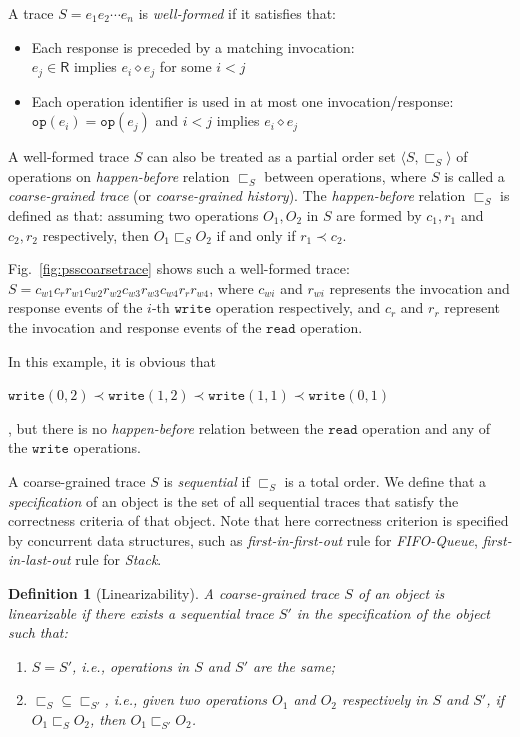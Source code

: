 \documentclass[runningheads]{llncs}
\newcommand{\eresp}{\mathsf{R}}
\newcommand{\pair}[1]{{\langle{#1}\rangle}}
\newtheorem{myDef}{Definition}
\newcommand{\wri}{\mathtt{write}}
\newcommand{\rea}{\mathtt{read}}
\newcommand{\hb}{\textit{happen-before }}
\begin{document}
 A trace $S = e_1e_2\cdots e_n$ is \textit{well-formed} if it satisfies that:
\begin{itemize}
  \item Each response is preceded by a matching invocation:\\
  $e_j\in \eresp$ implies $e_i \diamond e_j$ for some $i<j$
  \item Each operation identifier is used in at most one invocation/response:\\
  $\mathtt{op}(e_i)=\mathtt{op}(e_j)$ and $i<j$ implies $e_i \diamond e_j$
\end{itemize}
 A well-formed trace $S$ can also be treated as a partial order set $\pair{S,\sqsubset_S}$ of operations on \textit{happen-before}  relation $\sqsubset_S$ between operations, where $S$ is called a \textit{coarse-grained trace} (or \textit{coarse-grained history}). The \textit{happen-before} relation $\sqsubset_S$ is defined as that: assuming two operations $O_1,O_2$ in $S$ are formed by $c_1,r_1$ and $c_2,r_2$ respectively, then $O_1\sqsubset_S O_2$ if and only if $r_1\prec c_2$.

\begin{example}
Fig.~\ref{fig:psscoarsetrace} shows such a well-formed trace:
$S = c_{w1}c_rr_{w1}c_{w2}r_{w2}c_{w3}r_{w3}c_{w4}r_{r}r_{w4}$, where $c_{wi}$ and $r_{wi}$
represents the invocation and response events of the $i$-th $\mathtt{write}$ operation respectively, and
$c_r$ and $r_r$ represent the invocation and response events of the $\mathtt{read}$ operation.

In this example, it is obvious that \begin{small}$\wri(0,2)\prec \wri(1,2)\prec \wri(1,1)\prec \wri(0,1)$\end{small}, 
but there is no \hb  
relation between the $\rea$ operation and any of the $\wri$ operations.

\end{example}




A coarse-grained trace $S$ is \textit{sequential} if $\sqsubset_S$ is a total order. 
We define that a \textit{specification} of an object is the set of all sequential traces that satisfy the correctness criteria of that object. 
Note that here correctness criterion is specified by concurrent data structures, such as \textit{first-in-first-out} rule for \textit{FIFO-Queue}, \textit{first-in-last-out} rule for \textit{Stack}.

\begin{myDef}[Linearizability]\label{def:linearizability}
A coarse-grained trace $S$ of an object is linearizable if there exists a sequential trace $S'$ in the specification of the object such that:
\begin{enumerate}
  \item $S = S'$, i.e., operations in $S$ and $S'$ are the same;
  \item $\sqsubset_S \subseteq \sqsubset_{S'}$, i.e., given two operations $O_1$ and $O_2$ respectively in $S$ and $S'$, if $O_1\sqsubset_S O_2$, then $O_1\sqsubset_{S'} O_2$.
\end{enumerate}
\end{myDef}
\end{document}
